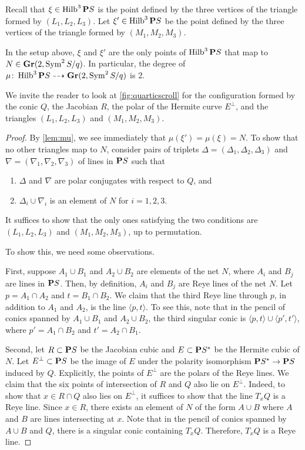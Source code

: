 \documentclass{amsart}
\renewcommand {\P}{{\bf P}}
\providecommand {\Gr}{{\bf Gr}}
\providecommand {\from}{{\colon}}
\providecommand{\Sym}{\operatorname{Sym}}
\numberwithin{equation}{section}
\DeclareMathOperator{\Hilb}{Hilb}
\begin{document}
Recall that $\xi \in \Hilb^3\P S$ is the point defined by the three vertices of the triangle formed by $(L_1, L_2, L_3)$.
Let $\xi' \in \Hilb^3\P S$ be the point defined by the three vertices of the triangle formed by $(M_1, M_2, M_3)$.
\begin{proposition}\label{prop:quarticscroll}
  In the setup above, $\xi$ and $\xi'$ are the only points of $\Hilb^3\P S$ that map to $N \in \Gr(2, \Sym^2S/q)$.
  In particular, the degree of $\mu \from \Hilb^3\P S \dashrightarrow \Gr(2, \Sym^2S/q)$ is 2.
\end{proposition}
We invite the reader to look at \autoref{fig:quarticscroll} for the configuration formed by the conic $Q$, the Jacobian $R$, the polar of the Hermite curve $E^\perp$, and the triangles $(L_1,L_2,L_3)$ and $(M_1,M_2,M_3)$.
\begin{proof}
  By \autoref{lem:mu}, we see immediately that $\mu(\xi') = \mu(\xi) = N$.
  To show that no other triangles map to $N$, consider pairs of triplets $\Delta = (\Delta_1, \Delta_2, \Delta_3)$ and $\nabla = (\nabla_1, \nabla_2, \nabla_3)$ of lines in $\P S$ such that
  \begin{enumerate}
  \item $\Delta$ and $\nabla$ are polar conjugates with respect to $Q$, and
  \item $\Delta_i \cup \nabla_i$ is an element of $N$ for $i = 1, 2, 3$.
  \end{enumerate}
  It suffices to show that the only ones satisfying the two conditions are $(L_1, L_2, L_3)$ and $(M_1, M_2, M_3)$, up to permutation.
  
  To show this, we need some observations.

  First, suppose $A_1 \cup B_1$ and $A_2\cup B_2$ are elements of the net $N$, where $A_i$ and $B_j$ are lines in $\P S$.
  Then, by definition, $A_i$ and $B_j$ are Reye lines of the net $N$.
  Let $p = A_1 \cap A_2$ and $t = B_1 \cap B_2$.
  We claim that the third Reye line through $p$, in addition to $A_1$ and $A_2$, is the line $\langle p, t\rangle$.
  To see this, note that in the pencil of conics spanned by $A_1 \cup B_1$ and $A_2 \cup B_2$, the third singular conic is $\langle p, t\rangle \cup \langle p', t'\rangle$, where $p' = A_1 \cap B_2$ and $t' = A_2 \cap B_1$.

  Second, let $R \subset \P S$ be the Jacobian cubic and $E \subset \P S^*$ be the Hermite cubic of $N$.
  Let $E^\perp \subset \P S$ be the image of $E$ under the polarity isomorphism $\P S^* \to \P S$ induced by $Q$.
  Explicitly, the points of $E^\perp$ are the polars of the Reye lines.
  We claim that the six points of intersection of $R$ and $Q$ also lie on $E^\perp$.
  Indeed, to show that $x \in R \cap Q$ also lies on $E^\perp$, it suffices to show that the line $T_xQ$ is a Reye line.
  Since $x \in R$, there exists an element of $N$ of the form $A\cup B$ where $A$ and $B$ are lines intersecting at $x$.
  Note that in the pencil of conics spanned by $A \cup B$ and $Q$, there is a singular conic containing $T_xQ$.
  Therefore, $T_xQ$ is a Reye line.
  

\end{proof}
\end{document}
